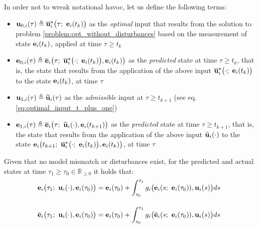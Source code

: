 In order not to wreak notational havoc, let us define the following terms:
\begin{gg_box}
\begin{itemize}
  \item $\bm{\mathbf{u}}_{0,i}(\tau) \triangleq \overline{\bm{\mathbf{u}}}_i^{\star}\big(\tau;\ \bm{\mathbf{e}}_i(t_k)\big)$
    as the \textit{optimal} input that results from the solution to problem
    \eqref{problem:opt_without_disturbances} based on the measurement of state
    $\bm{\mathbf{e}}_i(t_k)$, applied at time $\tau \geq t_k$
  \item $\vect{e}_{0,i}(\tau) \triangleq \overline{\vect{e}}_i\big(\tau;\ \overline{\vect{u}}_i^{\star}\big(\cdot;\ \vect{e}_i(t_k)\big), \vect{e}_i(t_k)\big)$
    as the \textit{predicted} state at time $\tau \geq t_k$, that is,
    the state that results from the application of the above input
    $\overline{\vect{u}}_i^{\star}\big(\cdot;\ \vect{e}_i(t_k)\big)$ to the
    state $\bm{\mathbf{e}}_i(t_k)$, at time $\tau$
  \item $\bm{\mathbf{u}}_{1,i}(\tau) \triangleq \widetilde{\bm{\mathbf{u}}}_i(\tau)$
    as the \textit{admissible} input at $\tau \geq t_{k+1}$ (see eq. \eqref{eq:optimal_input_t_plus_one})
  \item $\bm{\mathbf{e}}_{1,i}(\tau) \triangleq \overline{\bm{\mathbf{e}}}_i\big(\tau;\ \widetilde{\bm{\mathbf{u}}}_i(\cdot), \bm{\mathbf{e}}_i(t_{k+1})\big)$
    as the \textit{predicted} state at time $\tau \geq t_{k+1}$, that is,
    the state that results from the application of the above input
    $\widetilde{\bm{\mathbf{u}}}_i(\cdot)$ to the state
    $\vect{e}_i\big(t_{k+1};\ \overline{\vect{u}}_i^{\star}\big(\cdot;\ \vect{e}_i(t_k)\big), \vect{e}_i(t_k)\big)$, at time $\tau$
\end{itemize}
\end{gg_box}

\begin{bw_box}
  \begin{remark}
  \label{remark:predicted_actual_equations_without_disturbance}
    Given that no model mismatch or disturbances exist, for
    the predicted and actual states at time
    $\tau_1 \geq \tau_0 \in \mathbb{R}_{\geq 0}$ it holds that:
    \begin{align}
      \bm{\mathbf{e}}_i\big(\tau_1;\ \bm{\mathbf{u}}_i(\cdot), \bm{\mathbf{e}}_i(\tau_0)\big) &=
        \bm{\mathbf{e}}_i(\tau_0) + \int_{\tau_0}^{\tau_1} g_i\big(\bm{\mathbf{e}}_i(s;\ \bm{\mathbf{e}}_i(\tau_0)), \bm{\mathbf{u}}_i(s)\big) ds \\[2.5ex]
      \overline{\bm{\mathbf{e}}}_i\big(\tau_1;\ \bm{\mathbf{u}}_i(\cdot), \bm{\mathbf{e}}_i(\tau_0)\big) &=
        \bm{\mathbf{e}}_i(\tau_0) + \int_{\tau_0}^{\tau_1} g_i\big(\overline{\bm{\mathbf{e}}}_i(s;\ \bm{\mathbf{e}}_i(\tau_0)), \bm{\mathbf{u}}_i(s)\big) ds
    \end{align}
  \end{remark}
\end{bw_box}

